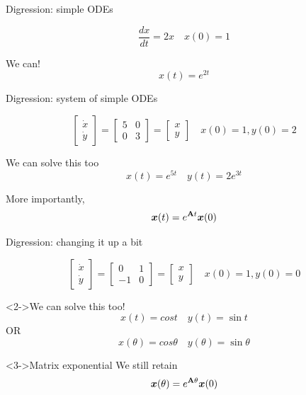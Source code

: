 \documentclass[notes]{beamer}
\newcommand{\gv}[1]{\ensuremath{\mbox{\boldmath$ #1 $}}}
\newcommand{\bv}[1]{\ensuremath{\mathbf{#1}}}
\begin{document}
\begin{frame}[label={sec:org382209d}]{Digression: simple ODEs}
\begin{example}
\[ \frac{dx}{dt} = 2x \quad x(0) = 1 \]
\end{example}
\begin{block}{We can!}
\[ x(t) = e^{2t}\]
\end{block}
\end{frame}
\begin{frame}[label={sec:org4ce1a36}]{Digression: system of simple ODEs}
\begin{example}
\[ \begin{bmatrix}\dot{x} \\ \dot{y} \end{bmatrix} =
	 \begin{bmatrix} 5 & 0 \\ 0 & 3 \end{bmatrix} =
	 \begin{bmatrix}{x} \\ {y} \end{bmatrix} \quad x(0) = 1, y(0) = 2\]
\end{example}
\begin{block}{We can solve this too}
\[ x(t) = e^{5t} \quad y(t) = 2e^{3t} \]

More importantly,
\[ \gv{x}(t) = e^{\bv{A}t}\gv{x}(0)\]
\end{block}
\end{frame}
\begin{frame}[label={sec:orgf88dd24}]{Digression: changing it up a bit}
\begin{example}
\[ \begin{bmatrix}\dot{x} \\ \dot{y} \end{bmatrix} =
	 \begin{bmatrix} 0 & 1 \\ -1 & 0 \end{bmatrix} =
	 \begin{bmatrix}{x} \\ {y} \end{bmatrix} \quad x(0) = 1, y(0) = 0\]
\end{example}
\begin{block}<2->{We can solve this too!}
\[ x(t) = cos{t} \quad y(t) = \sin{t} \]
\alert{OR}
\[ x(\theta) = cos{\theta} \quad y(\theta) = \sin{\theta} \]
\end{block}
\begin{alertblock}<3->{Matrix exponential}
We still retain \[ \gv{x}(\theta) = e^{\bv{A}\theta}\gv{x}(0) \]
\end{alertblock}
\end{frame}
\end{document}
